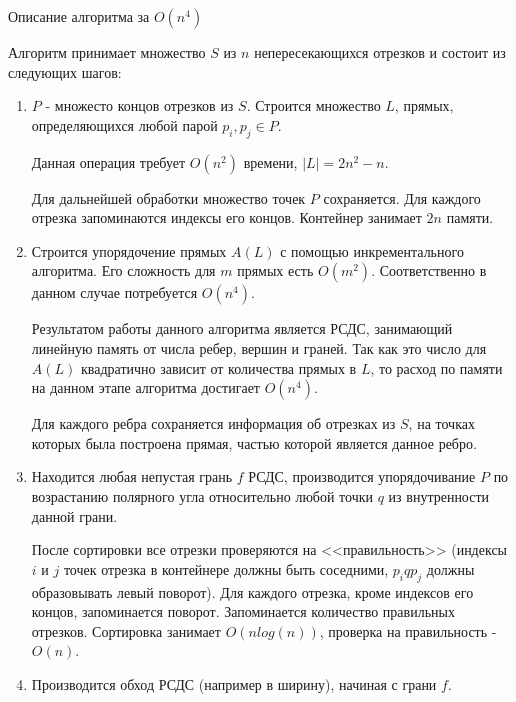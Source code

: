 \documentclass[letterpaper,12pt]{article}
\begin{document}
\begin{center}
Описание алгоритма за $O(n^4)$
\end{center}
\par
Алгоритм принимает множество $S$ из $n$ непересекающихся отрезков и 
состоит из следующих шагов:
\begin{enumerate}
      \item $P$ - множесто концов отрезков из $S$.
            Строится множество $L$, прямых, определяющихся любой парой $p_i, p_j \in P$.
            \par
            Данная операция требует $O(n^2)$ времени, $|L| = 2n^2-n$.
            \par
            Для дальнейшей обработки множество точек $P$ сохраняется.
            Для каждого отрезка запоминаются индексы его концов.
            Контейнер занимает $2n$ памяти.
      \item Строится упорядочение прямых $A(L)$ с помощью 
            инкрементального алгоритма. Его сложность для $m$ прямых
            есть $O(m^2)$. Соответственно в данном случае потребуется
            $O(n^4)$.
            \par
            Результатом работы данного алгоритма является РСДС,
            занимающий линейную память от числа ребер, вершин и граней.
            Так как это число для $A(L)$ квадратично зависит от количества
            прямых в $L$, то расход по памяти на данном этапе алгоритма достигает
            $O(n^4)$.
            \par
            Для каждого ребра сохраняется информация об отрезках из $S$,
            на точках которых была построена прямая, 
            частью которой является данное ребро.
      \item Находится любая непустая грань $f$ РСДС, производится упорядочивание $P$ 
            по возрастанию полярного угла относительно любой точки $q$ из внутренности 
            данной грани.
            \par
            После сортировки все отрезки проверяются на <<правильность>> 
            (индексы $i$ и $j$ точек отрезка в контейнере должны быть соседними,
            $p_i q p_j$ должны образовывать левый поворот). 
            Для каждого отрезка, кроме индексов его концов, запоминается поворот.
            Запоминается количество правильных отрезков. Сортировка занимает 
            $O(nlog(n))$, проверка на правильность - $O(n)$.
      \item Производится обход РСДС (например в ширину), начиная с грани $f$. 

\end{enumerate}
\end{document}
